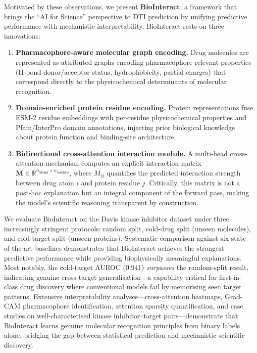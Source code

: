 \documentclass[fleqn,10pt]{wlscirep}
\begin{document}
Motivated by these observations, we present \textbf{BioInteract}, a framework
that brings the ``AI for Science'' perspective to DTI prediction by unifying
predictive performance with mechanistic interpretability.  BioInteract rests on
three innovations:

\begin{enumerate}[leftmargin=*]
\item \textbf{Pharmacophore-aware molecular graph encoding.}  Drug molecules are
  represented as attributed graphs encoding pharmacophore-relevant properties
  (H-bond donor/acceptor status, hydrophobicity, partial charges) that
  correspond directly to the physicochemical determinants of molecular
  recognition.

\item \textbf{Domain-enriched protein residue encoding.}  Protein representations
  fuse ESM-2 residue embeddings with per-residue physicochemical properties and
  Pfam/InterPro domain annotations, injecting prior biological knowledge about
  protein function and binding-site architecture.

\item \textbf{Bidirectional cross-attention interaction module.}  A multi-head
  cross-attention mechanism computes an explicit interaction matrix
  $\mathbf{M} \in \mathbb{R}^{n_\text{atoms} \times n_\text{residues}}$, where
  $M_{ij}$ quantifies the predicted interaction strength between drug atom $i$
  and protein residue $j$.  Critically, this matrix is not a post-hoc
  explanation but an integral component of the forward pass, making the model's
  scientific reasoning transparent by construction.
\end{enumerate}

We evaluate BioInteract on the Davis kinase inhibitor
dataset\cite{davis2011comprehensive} under three increasingly stringent
protocols: random split, cold-drug split (unseen molecules), and cold-target
split (unseen proteins).  Systematic comparison against six state-of-the-art
baselines demonstrates that BioInteract achieves the strongest predictive
performance while providing biophysically meaningful explanations.  Most
notably, the cold-target AUROC (0.941) \emph{surpasses} the random-split result,
indicating genuine cross-target generalisation---a capability critical for
first-in-class drug discovery where conventional models fail by memorising seen
target patterns.  Extensive interpretability analyses---cross-attention heatmaps,
Grad-CAM pharmacophore identification, attention sparsity quantification, and
case studies on well-characterised kinase inhibitor--target pairs---demonstrate
that BioInteract learns genuine molecular recognition principles from binary
labels alone, bridging the gap between statistical prediction and mechanistic
scientific discovery.
\end{document}
